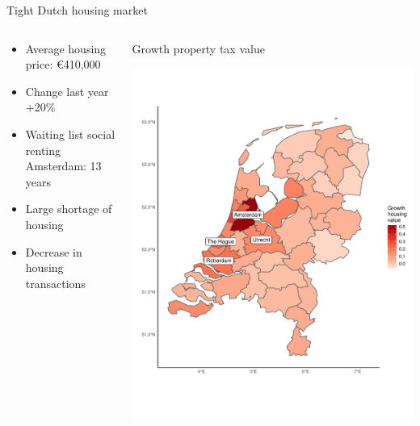 \documentclass{beamer}
\begin{document}
\begin{frame}{Tight Dutch housing market}
	\begin{columns}
		\begin{column}{0.5\textwidth}
			\begin{itemize}
				\item Average housing price: \euro 410,000 \newline
				\item Change last year +20\% \newline
				\item \alert{Waiting list} social renting Amsterdam: 13 years \newline
				\item Large \alert{shortage} of housing \newline
				\item Decrease in housing \alert{transactions}
			\end{itemize}
		\end{column}
		\begin{column}{0.5\textwidth}
						Growth property tax value \vspace{-1cm}
			\begin{center}
				\includegraphics[width=1\textwidth]{../../fig/growth_woz}
			\end{center}
		\end{column}
	\end{columns}
\end{frame}
\end{document}
